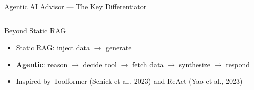 \documentclass[aspectratio=169, 11pt]{beamer}
\begin{document}
\begin{frame}{Agentic AI Advisor --- The Key Differentiator}
\begin{columns}[T]
\begin{exampleblock}{Beyond Static RAG}
\small
\begin{itemize}
  \item Static RAG: inject data $\rightarrow$ generate
  \item \textbf{Agentic}: reason $\rightarrow$ decide tool $\rightarrow$ fetch data $\rightarrow$ synthesize $\rightarrow$ respond
  \item Inspired by Toolformer (Schick et al., 2023) and ReAct (Yao et al., 2023)
\end{itemize}
\end{exampleblock}
\end{columns}
\end{frame}

\end{document}

